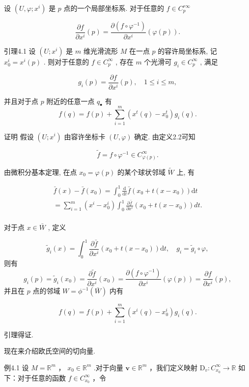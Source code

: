 设  $(U, \varphi; x^i)$  是  $p$  点的一个局部坐标系. 对于任意的  $f \in C_p^{r\infty}$

$$
\frac {\partial f}{\partial x ^ {i}} (p) = \frac {\partial (f \circ \varphi^ {- 1})}{\partial x ^ {i}} (\varphi (p)).
$$

引理4.1 设  $(U; x^i)$  是  $m$  维光滑流形  $M$  在一点  $p$  的容许局坐标系, 记  $x_0^i = x^i(p)$ . 则对于任意的  $f \in C_p^\infty$ , 存在  $m$  个光滑可  $g_i \in C_p^\infty$ , 满足

$$
g _ {i} (p) = \frac {\partial f}{\partial x ^ {i}} (p), \quad 1 \leqslant i \leqslant m,
$$

并且对于点  $p$  附近的任意一点  $q_{\bullet}$  有
$$
f (q) = f (p) + \sum_ {i = 1} ^ {m} \left(x ^ {t} (q) - x _ {0} ^ {t}\right) g _ {i} (q).
$$

证明 假设  $(U; x^i)$  由容许坐标卡  $(U, \varphi)$  确定. 由定义2.2可知

$$
\tilde {f} = f \circ \varphi^ {- 1} \in C _ {\varphi (p)} ^ {\infty}.
$$

由微积分基本定理, 在点  $x_0 = \varphi(p)$  的某个球状邻域  $\tilde{W}$  上, 有

$$
\begin{array}{l} \bar {f} (x) - \bar {f} (x _ {0}) = \int_ {0} ^ {1} \frac {\mathrm {d}}{\mathrm {d} t} \bar {f} (x _ {0} + t (x - x _ {0})) \mathrm {d} t \\ = \sum_ {i = 1} ^ {m} \left(x ^ {i} - x _ {0} ^ {i}\right) \int_ {0} ^ {1} \frac {\partial \bar {f}}{\partial x ^ {i}} \left(x _ {0} + t (x - x _ {0})\right) d t. \\ \end{array}
$$

对于点  $x \in \bar{W}$ , 定义

$$
\tilde {g} _ {i} (x) = \int_ {0} ^ {1} \frac {\partial \bar {f}}{\partial x ^ {i}} (x _ {0} + t (x - x _ {0})) \mathrm {d} t, \quad g _ {i} = \tilde {g} _ {i} \circ \varphi ,
$$
则有
$$
g _ {i} (p) = \tilde {g} _ {i} (x _ {0}) = \frac {\partial \tilde {f}}{\partial x ^ {i}} (x _ {0}) = \frac {\partial (f \circ \varphi^ {- 1})}{\partial x ^ {i}} (\varphi (p)) = \frac {\partial f}{\partial x ^ {i}} (p),
$$
并且在  $p$  点的邻域  $W = \phi^{-1}(\bar{W})$  内有

$$
f (q) = f (p) + \sum_ {i = 1} ^ {m} \left(x ^ {i} (q) - x _ {0} ^ {i}\right) g _ {i} (q).
$$

引理得证.

现在来介绍欧氏空间的切向量.

例4.1 设  $M = \mathbb{R}^m$  ，  $x_0\in \mathbb{R}^m$  .对于向量  $\pmb {v}\in \mathbb{R}^{m}$  ，我们定义映射 $\mathrm{D}_v:C_{x_0}^\infty \to \mathbb{R}$  如下：对于任意的函数  $f\in C_{x_0}^\infty$  ，令

